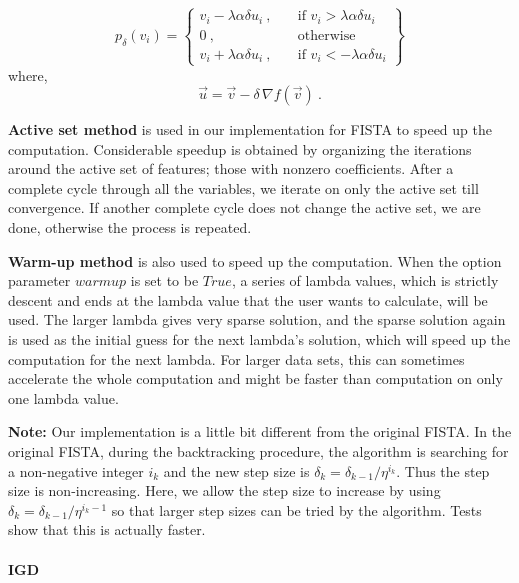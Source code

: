 \begin{equation}
p_\delta (v_i) = \left\{ \begin{array}{ll}
v_i - \lambda\alpha\delta u_i\ , \quad  & \mbox{if } v_i > \lambda\alpha\delta
u_i \\
0\ , \quad & \mbox{otherwise} \\
v_i + \lambda\alpha\delta u_i\ , \quad & \mbox{if } v_i < - \lambda\alpha\delta u_i
\end{array}
\right\}
\end{equation}
where,
\begin{equation}
\vec{u} = \vec{v} - \delta\,\nabla f(\vec{v})\ .
\end{equation}

{\bf Active set method} is used in our implementation for FISTA to
speed up the computation. Considerable speedup is obtained by
organizing the iterations around the active set of features; those
with nonzero coefficients. After a complete cycle through all the
variables, we iterate on only the active set till convergence. If
another complete cycle does not change the active set, we are done,
otherwise the process is repeated.

{\bf Warm-up method} is also used to speed up the computation. When
the option parameter $warmup$ is set to be $True$, a series of lambda
values, which is strictly descent and ends at the lambda value that
the user wants to calculate, will be used. The larger lambda gives
very sparse solution, and the sparse solution again is used as the
initial guess for the next lambda's solution, which will speed up the
computation for the next lambda. For larger data sets, this can
sometimes accelerate the whole computation and might be faster than
computation on only one lambda value.

{\bf Note:} Our implementation is a little bit different from the
original FISTA. In the original FISTA, during the backtracking
procedure, the algorithm is searching for a non-negative integer $i_k$
and the new step size is $\delta_k = \delta_{k-1}/\eta^{i_k}$. Thus
the step size is non-increasing. Here, we allow the step size to
increase by using $\delta_k = \delta_{k-1}/\eta^{i_k-1}$ so that
larger step sizes can be tried by the algorithm. Tests show that this
is actually faster.

\paragraph{IGD}

